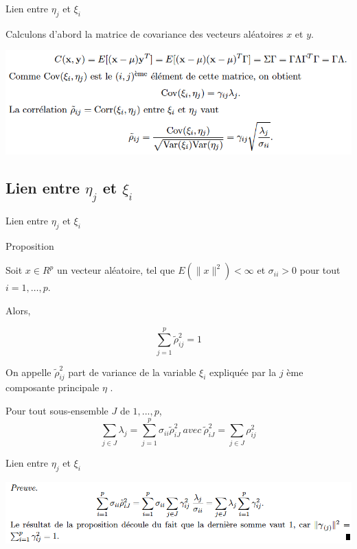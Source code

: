 \documentclass[11pt]{beamer}
\begin{document}

\begin{frame}{Lien entre $\eta_j$ et $\xi_i$}

  
  Calculons d’abord la matrice de covariance des vecteurs aléatoires $x$ et $y$.
  
  \includegraphics[scale=0.4]{EtaVar.png}
  
  
\end{frame}



\subsection{Lien entre $\eta_j$ et $\xi_i$}
\begin{frame}{Lien entre $\eta_j$ et $\xi_i$}

  \begin{block}{Proposition}
  
  Soit $x \in R^p$ un vecteur aléatoire, tel que $E(\parallel x \parallel^2) < \infty$ et $\sigma_{ii} > 0$ pour tout $i = 1, \ldots ,p$. 
 
  Alors, 
  
  $$\sum_{j=1}^p \tilde{\rho}^2_{ij} =1$$
  
  \end{block}
 
  On appelle $ \tilde{\rho}^2_{ij} $ part de variance de la variable $\xi_i$ expliquée par la $j$ ème composante principale $\eta$ .
  
  Pour tout sous-ensemble $J$ de $ {1, . . . ,p}$,
  $$\sum_{j \in J} \lambda_j=\sum_{j=1}^p \sigma_{ii}\tilde{\rho}^2_{iJ} \ avec \  \tilde{\rho}^2_{iJ} = \sum_{j \in J}{\rho}^2_{ij} $$
\end{frame}


\begin{frame}{Lien entre $\eta_j$ et $\xi_i$}


 \includegraphics[scale=0.37]{Rho_ij.png}


\end{frame}
\end{document}
